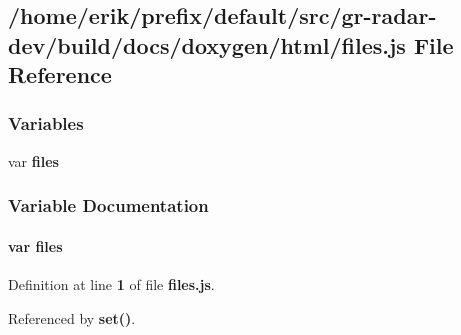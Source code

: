 \subsection{/home/erik/prefix/default/src/gr-\/radar-\/dev/build/docs/doxygen/html/files.js File Reference}
\label{files_8js}
\subsubsection*{Variables}
\begin{DoxyCompactItemize}
\item 
var {\bf files}
\end{DoxyCompactItemize}


\subsubsection{Variable Documentation}
\paragraph[{files}]{\setlength{\rightskip}{0pt plus 5cm}var files}\label{files_8js_a0742cac2750bccc2d88ac080fb9daa22}


Definition at line {\bf 1} of file {\bf files.\+js}.



Referenced by {\bf set()}.


